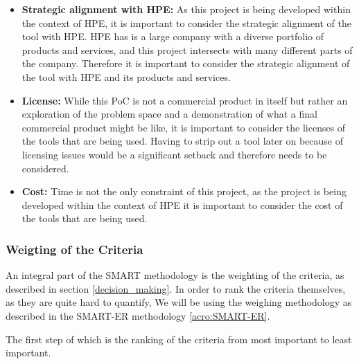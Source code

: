 \begin{itemize}
    \item \textbf{Strategic alignment with \ac{HPE}:}
        As this project is being developed within the context of \ac{HPE}, it is important to consider the strategic alignment of the tool with \ac{HPE}.
        \ac{HPE} has is a large company with a diverse portfolio of products and services, and this project intersects with many different parts of the company.
        Therefore it is important to consider the strategic alignment of the tool with \ac{HPE} and its products and services.

    \item \textbf{License:}
        While this \ac{PoC} is not a commercial product in itself but rather an exploration of the problem space and a demonstration of what a final commercial product  might be like,
        it is important to consider the licenses of the tools that are being used.
        Having to strip out a tool later on because of licensing issues would be a significant setback and therefore needs to be considered.

    \item \textbf{Cost:}
        Time is not the only constraint of this project, as the project is being developed within the context of \ac{HPE} it is important to consider the cost of the tools that are being used.

\end{itemize}

\subsubsection{Weigting of the Criteria}

An integral part of the \ac{SMART} methodology is the weighting of the criteria, as described in section \ref{decision_making}.
In order to rank the criteria themselves, as they are quite hard to quantify, 
We will be using the weighing methodology as described in the \ac{SMART-ER} methodology \ref{acro:SMART-ER}.

The first step of which is the ranking of the criteria from most important to least important.

